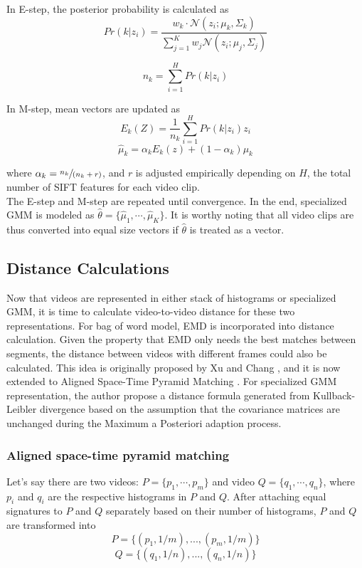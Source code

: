	\noindent In E-step, the posterior probability is calculated as
	\begin{equation}
	Pr(k|z_i) = \frac{w_k \cdot \mathcal{N} (z_i ; \mu_k, \Sigma_k) }{\sum_{j=1}^{K}w_j \mathcal{N}(z_i ; \mu_j, \Sigma_j)}
	\end{equation}   

	\begin{equation}
	n_k = \sum_{i=1}^{H}Pr(k|z_i)
	\end{equation}

	\noindent In M-step, mean vectors are updated as
	\begin{equation}
	E_k(Z) = \frac{1}{n_k} \sum_{i=1}^{H} Pr(k|z_i) z_i
	\end{equation}
	\begin{equation}
	\hat\mu_k = \alpha_k E_k(z) + (1 - \alpha_k) \mu_k
	\end{equation}

	\noindent where $\alpha_k = \sfrac{n_k}{(n_k + r)}$, and $r$ is adjusted empirically depending on $H$, the total number of SIFT features for each video clip.\\

	\noindent The E-step and M-step are repeated until convergence. In the end, specialized GMM is modeled as $\hat\theta = \{\hat\mu_1, \cdots, \hat\mu_K \}$. It is worthy noting that all video clips are thus converted into equal size vectors if $\hat\theta$ is treated as a vector.

\subsection{Distance Calculations}
	Now that videos are represented in either stack of histograms or specialized GMM, it is time to calculate video-to-video distance for these two representations. For bag of word model, EMD is incorporated into distance calculation. Given the property that EMD only needs the best matches between segments, the distance between videos with different frames could also be calculated. This idea is originally proposed by Xu and Chang \cite{xu2007visual}, and it is now extended to Aligned Space-Time Pyramid Matching \cite{duan2012visual}. For specialized GMM representation, the author \cite{zhou2008sift} propose a distance formula generated from Kullback-Leibler divergence based on the assumption that the covariance matrices are unchanged during the Maximum a Posteriori adaption process.
	
	\subsubsection{Aligned space-time pyramid matching}
	Let's say there are two videos: $P = \{p_1, \cdots, p_m\}$ and video $Q = \{q_1, \cdots, q_n\}$, where $p_i$ and $q_i$ are the respective histograms in $P$ and $Q$. After attaching equal signatures to $P$ and $Q$ separately based on their number of histograms, $P$ and $Q$ are transformed into
	$$P = \{(p_1, 1 / m),...,(p_m, 1 / m) \}$$
	$$Q = \{(q_1, 1 / n),...,(q_n, 1 / n) \}$$
	
